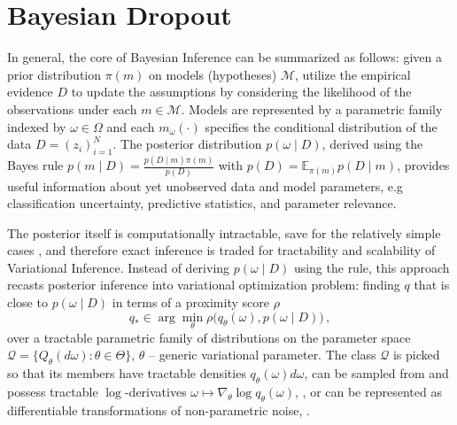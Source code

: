 \documentclass[a4paper,10pt]{article}
\begin{document}


\section{Bayesian Dropout} %
\label{sec:bayesian_dropout}

In general, the core of Bayesian Inference can be summarized as follows: given a prior
distribution $\pi(m)$ on models (hypotheses) $\mathcal{M}$, utilize the empirical evidence
$D$ to update the assumptions by considering the likelihood of the observations under each
$m \in \mathcal{M}$. Models are represented by a parametric family indexed by $\omega \in
\Omega$ and each $m_\omega(\cdot)$ specifies the conditional distribution of the data $
  D = (z_i)_{i=1}^N
$. The posterior distribution $p(\omega \mid D)$, derived using the Bayes rule $
  p(m \mid D) = \tfrac{p(D \mid m) \pi(m)}{p(D)}
$ with $
  p(D) = \mathbb{E}_{\pi(m)} p(D \mid m)
$, provides useful information about yet unobserved data and model parameters, e.g
classification uncertainty, predictive statistics, and parameter relevance.

The posterior itself is computationally intractable, save for the relatively simple cases
\citep{citation_needed}, and therefore exact inference is traded for tractability and scalability
of Variational Inference. Instead of deriving $p(\omega \mid D)$ using the rule, this approach
recasts posterior inference into variational optimization problem: finding $q$ that is close
to $p(\omega \mid D)$ in terms of a proximity score $\rho$
\begin{equation}  \label{eq:variational-progam}
  q_*
    \in \arg \min_{\theta} \rho\bigl(
      q_\theta(\omega), p(\omega \mid D)
    \bigr)
    \,,
\end{equation}
over a tractable parametric family of distributions on the parameter space $
  \mathcal{Q} = \{Q_\theta(d\omega) \colon \theta \in \Theta\}
$, $\theta$ -- generic variational parameter. The class $\mathcal{Q}$ is picked so that
its members have tractable densities $
  q_\theta(\omega) d\omega
$, can be sampled from and possess tractable $\log$-derivatives $
  \omega \mapsto \nabla_\theta \log q_\theta(\omega)
$, \citep{williams_simple_1992}, or can be represented as differentiable transformations
of non-parametric noise, \citep{kingma_auto-encoding_2014,figurnov_implicit_2019}.
\end{document}
